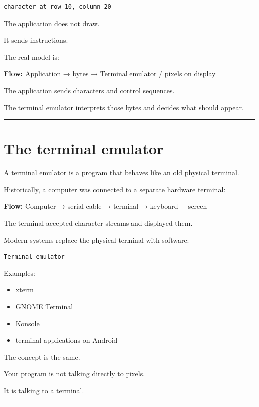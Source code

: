 \documentclass[
  oneside,
  openany]{book}
\providecommand{\tightlist}{%
  \setlength{\itemsep}{0pt}\setlength{\parskip}{0pt}}
\begin{document}
\begin{verbatim}
character at row 10, column 20
\end{verbatim}

The application does not draw.

It sends instructions.

The real model is:

\textbf{Flow:} Application → bytes → Terminal emulator / pixels on
display

The application sends characters and control sequences.

The terminal emulator interprets those bytes and decides what should
appear.

\begin{center}\rule{0.5\linewidth}{0.5pt}\end{center}

\hypertarget{the-terminal-emulator}{%
\section{The terminal emulator}\label{the-terminal-emulator}}

A terminal emulator is a program that behaves like an old physical
terminal.

Historically, a computer was connected to a separate hardware terminal:

\textbf{Flow:} Computer → serial cable → terminal → keyboard + screen

The terminal accepted character streams and displayed them.

Modern systems replace the physical terminal with software:

\begin{verbatim}
Terminal emulator
\end{verbatim}

Examples:

\begin{itemize}
\tightlist
\item
  xterm
\item
  GNOME Terminal
\item
  Konsole
\item
  terminal applications on Android
\end{itemize}

The concept is the same.

Your program is not talking directly to pixels.

It is talking to a terminal.

\begin{center}\rule{0.5\linewidth}{0.5pt}\end{center}
\end{document}

